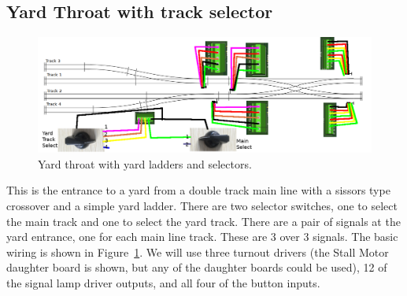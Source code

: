 %
%
%
%
% 
%
%
%
%
%
% 
%

\subsection{Yard Throat with track selector}
\label{sect-appl:yardthroat}

\begin{figure}[hbpt]\begin{centering}%
\includegraphics[width=5in]{YardThroat_TrackSelector.png}
\caption{Yard throat with yard ladders and selectors.}
\label{fig:YardThroatTrackSelector}
\end{centering}\end{figure}

This is the entrance to a yard from a double track main line with a sissors 
type crossover and a simple yard ladder.  There are two selector switches, one 
to select the main track and one to select the yard track.  There are a pair 
of signals at the yard entrance, one for each main line track.  These are 3 
over 3 signals.  The basic wiring is shown in 
Figure~\ref{fig:YardThroatTrackSelector}. We will use three turnout drivers 
(the Stall Motor daughter board is shown, but any of the daughter 
boards could be used), 12 of the signal lamp driver outputs, and all four of 
the button inputs.

